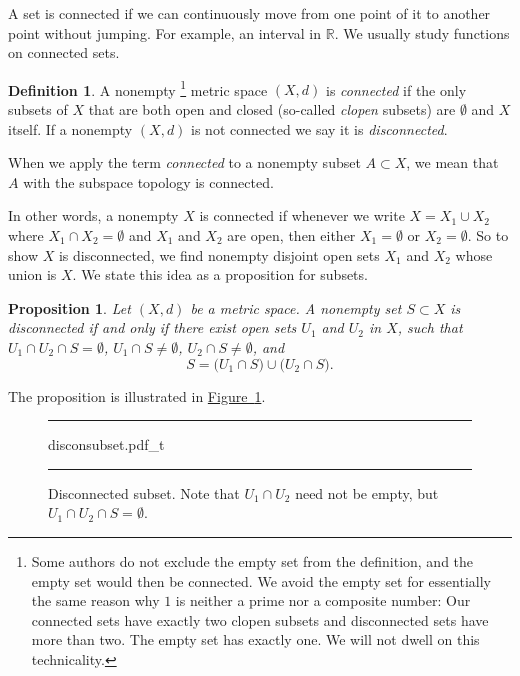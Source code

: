 \documentclass[12pt,openany]{book}
\newcommand{\R}{{\mathbb{R}}}
\newcommand{\myindex}[1]{#1\index{#1}}
\theoremstyle{plain}
\newtheorem{prop}[thm]{Proposition}
\theoremstyle{remark}
\theoremstyle{definition}
\newtheorem{defn}[thm]{Definition}
\newenvironment{myfig}{%
\begin{figure}[h!t]
\noindent\rule{\textwidth}{0.5pt}\vspace{12pt}\par\centering}%
{\par\noindent\rule{\textwidth}{0.5pt}
\end{figure}}
\theoremstyle{exercise}
\theoremstyle{example}
\newcommand{\figureref}[1]{\hyperref[#1]{Figure~\ref*{#1}}}
\begin{document}
A set is connected if we can continuously move from one point of it to
another point without jumping.  For example, an interval in $\R$.
We usually study functions on connected sets.

\begin{defn}
A nonempty%
\footnote{Some authors do not exclude the empty set from the definition,
and the empty set would then be connected.
We avoid the empty set for essentially the same reason why
$1$ is neither a prime nor a composite number:  Our connected sets have exactly
two clopen subsets and disconnected sets have more than two.  The empty set
has exactly one.  We will not dwell on this technicality.}
metric space $(X,d)$ is \emph{\myindex{connected}} if the
only subsets of $X$ that are both open and closed (so-called
\emph{\myindex{clopen}} subsets) are $\emptyset$ and $X$ itself.
If a nonempty $(X,d)$ is not connected we say it is
\emph{\myindex{disconnected}}.

When we apply the term \emph{connected} to a nonempty subset $A \subset X$, we 
mean that $A$ with the subspace topology is connected.
\end{defn}

In other words, a nonempty $X$ is connected if whenever we write
$X = X_1 \cup X_2$ where $X_1 \cap X_2 = \emptyset$ and $X_1$ and $X_2$ are
open, then either $X_1 = \emptyset$ or $X_2 = \emptyset$.
So to show $X$ is disconnected, we find nonempty
disjoint open sets $X_1$ and
$X_2$ whose union is $X$.
We state this idea as a proposition for subsets.

\begin{prop}
Let $(X,d)$ be a metric space.
A nonempty set $S \subset X$ is disconnected if and only if
there exist open sets $U_1$ and
$U_2$ in $X$, such that $U_1 \cap U_2 \cap S = \emptyset$,
$U_1 \cap S \not= \emptyset$,
$U_2 \cap S \not= \emptyset$, and
\begin{equation*}
S = 
\bigl( U_1 \cap S \bigr)
\cup
\bigl( U_2 \cap S \bigr) .
\end{equation*}
\end{prop}

The proposition is illustrated in \figureref{fig:disconsubset}.

\begin{myfig}
{disconsubset.pdf_t}
\caption{Disconnected subset.  Note that $U_1 \cap U_2$ need
not be empty, but $U_1 \cap U_2 \cap S = \emptyset$.\label{fig:disconsubset}}
\end{myfig}
\end{document}
